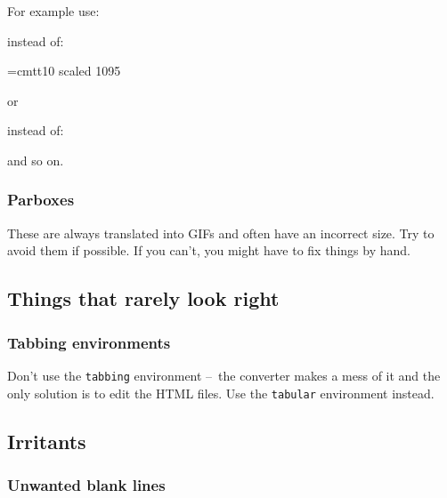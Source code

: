 \documentclass[twoside,11pt,nolof]{starlink}
\providecommand{\dash}{--}
\begin{document}
For example use:
\begin{terminalv}
\end{terminalv}
instead of:
\begin{terminalv}
\font\ssttt=cmtt10 scaled 1095
\end{terminalv}
or
\begin{terminalv}
\providecommand{\_}{\texttt\symbol{95}}
\end{terminalv}
instead of:
\begin{terminalv}
\providecommand{\_}{\tt\char'137}
\end{terminalv}
and so on.

\subsubsection{Parboxes}

These are always translated into GIFs and often have an incorrect
size.
Try to avoid them if possible.
If you can't, you might have to fix things by hand.

\subsection{Things that rarely look right}

\subsubsection{Tabbing environments}

Don't use the \verb#tabbing# environment \dash\ the converter makes a
mess of it and the only solution is to edit the HTML files.
Use the \verb#tabular# environment instead.

\subsection{Irritants}

\subsubsection{Unwanted blank lines}
\end{document}
